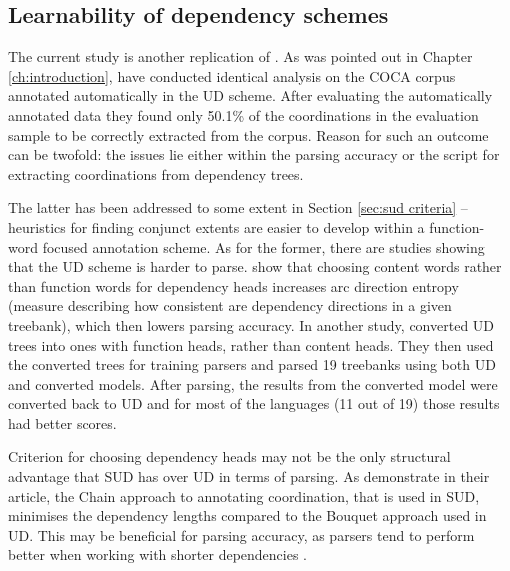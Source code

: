\subsection{Learnability of dependency schemes}\label{sec:learnability}
The current study is another replication of \cite{prz:woz:23}. As was pointed out in Chapter \ref{ch:introduction}, \cite{pbg2023} have conducted identical analysis on the COCA corpus annotated automatically in the UD scheme. After evaluating the automatically annotated data they found only 50.1\% of the coordinations in the evaluation sample to be correctly extracted from the corpus. Reason for such an outcome can be twofold: the issues lie either within the parsing accuracy or the script for extracting coordinations from dependency trees. 

The latter has been addressed to some extent in Section \ref{sec:sud criteria} -- heuristics for finding conjunct extents are easier to develop within a function-word focused annotation scheme. As for the former, there are studies showing that the UD scheme is harder to parse. \cite{rehbein-etal-2017-universal} show that choosing content words rather than function words for dependency heads increases arc direction entropy (measure describing how consistent are dependency directions in a given treebank), which then lowers parsing accuracy. In another study, \cite{kohita-etal-2017-multilingual} converted UD trees into ones with function heads, rather than content heads. They then used the converted trees for training parsers and parsed 19 treebanks using both UD and converted models. After parsing, the results from the converted model were converted back to UD and for most of the languages (11 out of 19) those results had better scores. 

Criterion for choosing dependency heads may not be the only structural advantage that SUD has over UD in terms of parsing. As \cite{gerdes-etal-2018-sud} demonstrate in their article, the Chain approach to annotating coordination, that is used in SUD, minimises the dependency lengths compared to the Bouquet approach used in UD. This may be beneficial for parsing accuracy, as parsers tend to perform better when working with shorter dependencies \citep{nilsson-etal-2006-graph, eisner-smith-2005-parsing}. 

